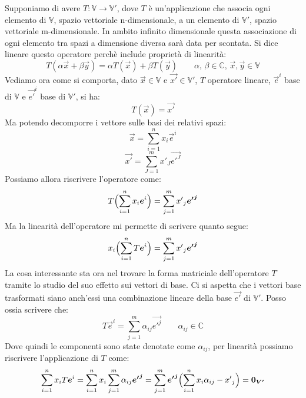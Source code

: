 Supponiamo di avere $T:\mathbb{V} \longrightarrow \mathbb{V'}$, dove $T$ è un'applicazione che associa ogni elemento di $\mathbb{V}$, spazio vettoriale n-dimensionale, a un elemento di $\mathbb{V'}$, spazio vettoriale m-dimensionale. In ambito infinito dimensionale questa associazione di ogni elemento tra spazi a dimensione diversa sarà data per scontata. Si dice lineare questo operatore perchè include proprietà di linearità:
\begin{equation}
    T(\alpha\vec{x}+\beta\vec{y}) = \alpha T(\vec{x}) + \beta T(\vec{y}) \qquad
    \alpha, \, \beta \in \mathbb{C}, \, \vec{x},\vec{y} \in \mathbb{V}
\end{equation}
Vediamo ora come si comporta, dato $\vec{x}\in\mathbb{V}$ e $\vec{x'}\in\mathbb{V'}$, $T$ operatore lineare, ${\vec{e}^i}$ base di $\mathbb{V}$ e ${\vec{{e'}}^i}$ base di $\mathbb{V'}$, si ha:
\begin{equation*}
    T(\vec{x})=\vec{x'}
\end{equation*}
Ma potendo decomporre i vettore sulle basi dei relativi spazi:
\begin{equation*}
    \vec{x}=\sum_{i=1}^{n} x_i \vec{e}^i
\end{equation*}
\begin{equation*}
    \vec{x'}=\sum_{J=1}^{m} {x'}_J \vec{{e'}^J}
\end{equation*}
Possiamo allora riscrivere l'operatore come:
\begin{equation*}
    T\Bigl(\sum_{i=1}^{n} x_i \vec{e}^i\Bigr) = \sum_{j=1}^{m} {x'}_j \vec{{e'}^j}
\end{equation*}
Ma la linearità dell'operatore mi permette di scrivere quanto segue:
\begin{equation*}
    x_i\Bigl(\sum_{i=1}^{n} T \vec{e}^i\Bigr) = \sum_{j=1}^{m} {x'}_j \vec{{e'}^j}
\end{equation*}
La cosa interessante sta ora nel trovare la forma matriciale dell'operatore $T$ tramite lo studio del suo effetto sui vettori di base. Ci si aspetta che i vettori base trasformati siano anch'essi una combinazione lineare della base $\vec{e'}$ di $\mathbb{V'}$. Posso ossia scrivere che:
\begin{equation*}
    T\vec{e}^i = \sum_{j=1}^{m} \alpha_{ij} \vec{{e'}^j} \qquad \alpha_{ij}\in\mathbb{C}
\end{equation*}
Dove quindi le componenti sono state denotate come $\alpha_{ij}$, per linearità possiamo riscrivere l'applicazione di $T$ come:
\begin{equation*}
    \sum_{i=1}^{n} x_i T\vec{e}^i =
    \sum_{i=1}^{n} x_i \sum_{j=1}^{m} \alpha_{ij} \vec{{e'}^j} =
    \sum_{j=1}^{m} \vec{{e'}^j} \Bigl( \sum_{i=1}^{n} x_i\alpha_{ij} - {x'}_j \Bigr) =
    \vec{0_{V'}}
\end{equation*}
